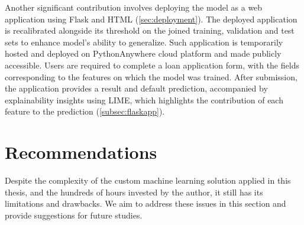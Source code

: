 Another significant contribution involves deploying the model as a web application using Flask and HTML (\autoref{sec:deployment}).
The deployed application is recalibrated alongside its threshold on the joined training, validation and test sets to enhance model's ability to generalize.
Such application is temporarily hosted and deployed on PythonAnywhere cloud platform and made publicly accessible.
Users are required to complete a loan application form, with the fields corresponding to the features on which the model was trained.
After submission, the application provides a result and default prediction, accompanied by explainability insights using LIME, which highlights the contribution of each feature to the prediction (\autoref{subsec:flaskapp}).


\section{Recommendations}
\label{sec:recommendations}
Despite the complexity of the custom machine learning solution applied in this thesis, and the hundreds of hours invested by the author, it still has its limitations and drawbacks. We aim to address these issues in this section and provide suggestions for future studies.
